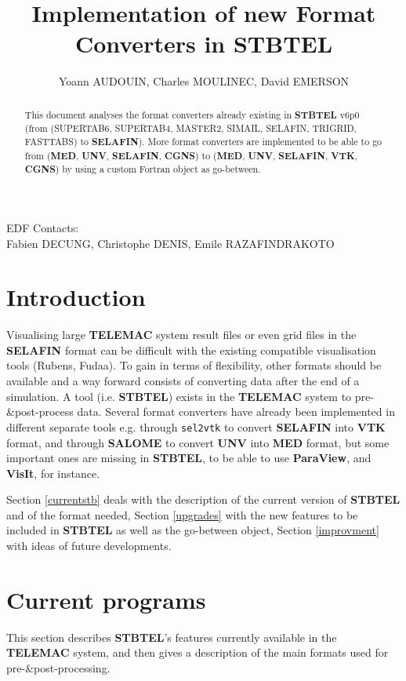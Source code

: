 \documentclass[a4paper,10pt]{article}
\newcommand{\tel}{\textbf{TELEMAC}\xspace}
\newcommand{\stb}{\textbf{STBTEL}\xspace}
\newcommand{\slf}{\textbf{SELAFIN}\xspace}
\newcommand{\sal}{\textbf{SALOME}\xspace}
\newcommand{\unv}{\textbf{UNV}\xspace}
\newcommand{\med}{\textbf{MED}\xspace}
\newcommand{\vtk}{\textbf{VTK}\xspace}
\newcommand{\cgns}{\textbf{CGNS}\xspace}
\begin{document}
\title{Implementation of new Format Converters in \stb}
\author{Yoann AUDOUIN, Charles MOULINEC, David EMERSON}


\maketitle
\begin{abstract}
This document analyses the format converters already existing in \stb v6p0 (from 
(SUPERTAB6, SUPERTAB4, MASTER2, SIMAIL, SELAFIN, TRIGRID, FASTTABS) to \slf).
More format converters are implemented to be able to
go from (\med, \unv, \slf, \cgns) to (\med, \unv, \slf, \vtk, \cgns) by using a custom Fortran object as go-between.
\end{abstract}
\vfill
EDF Contacts: \\
Fabien DECUNG, Christophe DENIS, Emile RAZAFINDRAKOTO
\newpage

\section{Introduction}
Visualising large \tel system\cite{telemac} result files or even grid files in the \slf format can be difficult with the existing compatible
visualisation tools (Rubens, Fudaa). To gain in terms of flexibility, other formats should be available and a way
forward consists of converting data after the end of a simulation.
A tool (i.e. \stb) exists in the \tel system to pre-\&post-process data. Several format converters have already
been implemented in different separate tools e.g. through \verb+sel2vtk+ to convert \slf into \vtk format, and through \sal\cite{salome} to convert \unv into \med format, 
but some important ones are missing in \stb, to be able to use \textbf{ParaView}\cite{paraview},
and \textbf{VisIt}\cite{visit}, for instance.

Section \ref{currentstb} deals with the description of the current version of \stb and of the format needed, 
Section \ref{upgrades} with the new features to be included in \stb as well as the go-between object, 
Section \ref{improvment} with ideas of future developments.

\section{\label{currentstb}Current programs}
This section describes \stb's features currently available in the \tel system,
and then gives a description of the main formats used for pre-\&post-processing.
\end{document}
